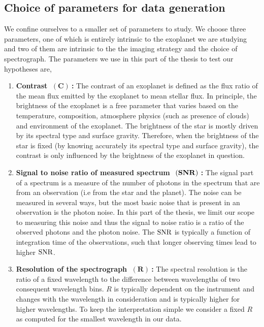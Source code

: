 \subsection{ Choice of parameters for data generation}
We confine ourselves to a smaller set of parameters to study.
We choose three parameters, one of which is entirely intrinsic to the exoplanet we are studying and two of them are intrinsic to the the imaging strategy and the choice of spectrograph.
The parameters we use in this part of the thesis to test our hypotheses are,
 \begin{enumerate}
     \item \textbf{Contrast $~(\mathbf{C})~$:}
     The contrast of an exoplanet is defined as the flux ratio of the mean flux emitted by the exoplanet to mean stellar flux. 
     In principle, the brightness of the exoplanet is a free parameter that varies based on the temperature, composition, atmosphere physics (such as presence of clouds) and environment of the exoplanet. 
     The brightness of the star is mostly driven by its spectral type and surface gravity.
     Therefore, when the brightness of the star is fixed (by knowing accurately its spectral type and surface gravity), the contrast is only influenced by the brightness of the exoplanet in question.
     \item \textbf{Signal to noise ratio of measured spectrum $~(\rm{\mathbf{SNR}})~$:}
     The signal part of a spectrum is a measure of the number of photons in the spectrum that are from an observation (i.e from the star and the planet).
     The noise can be measured in several ways, but the most basic noise that is present in an observation is the photon noise.
     In this part of the thesis, we limit our scope to measuring this noise and thus the signal to noise ratio is a ratio of the observed photons and the photon noise.
     The $\rm{SNR}$ is typically a function of integration time of the observations, such that longer observing times lead to higher $\rm{SNR}$.
     \item \textbf{Resolution of the spectrograph $~(\mathbf{R})~$:}
     The spectral resolution is the ratio of a fixed wavelength to the difference between wavelengths of two consequent wavelength bins.
     $R$ is typically dependent on the instrument and changes with the wavelength in consideration and is typically higher for higher wavelengths.
     To keep the interpretation simple we consider a fixed $R$ as computed for the smallest wavelength in our data.
 \end{enumerate}
